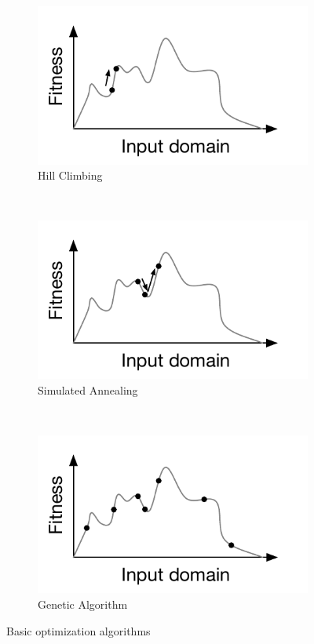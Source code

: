 \documentclass[11pt]{sdm}
\begin{document}
\begin{figure}
  \centering
  \begin{subfigure}[b]{0.33\textwidth}
    \includegraphics[width=\textwidth]{hillclimbing}
\caption{Hill Climbing}
\label{fig:hill_climbing}
  \end{subfigure}%
~%
  \begin{subfigure}[b]{0.33\textwidth}
    \includegraphics[width=\textwidth]{simulated_annealing}
\caption{Simulated Annealing}
\label{fig:simulated_annealing}
  \end{subfigure}%
~%
  \begin{subfigure}[b]{0.33\textwidth}
    \includegraphics[width=\textwidth]{genetic_algo}
\caption{Genetic Algorithm}
\label{fig:genetic_algo}
  \end{subfigure}
\caption{Basic optimization algorithms}
\label{fig:optimization_algos}
\end{figure}
\end{document}
